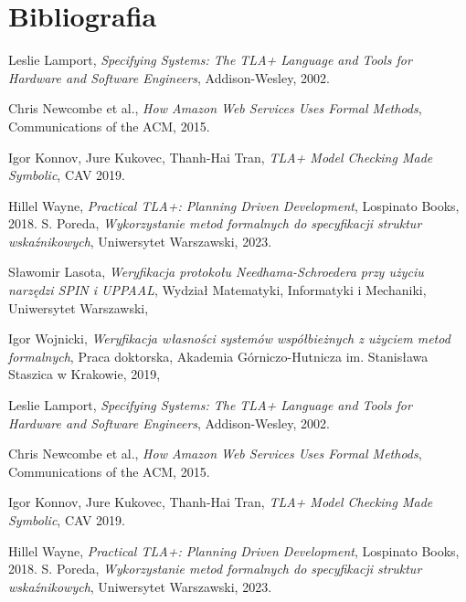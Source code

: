 \documentclass[conference]{IEEEtran}
\begin{document}
    
    \section{Bibliografia}
        \begin{thebibliography}{00}
            Leslie Lamport, \emph{Specifying Systems: The TLA+ Language and Tools for Hardware and Software Engineers}, Addison-Wesley, 2002.
          
            Chris Newcombe et al., \emph{How Amazon Web Services Uses Formal Methods}, Communications of the ACM, 2015.
          
            Igor Konnov, Jure Kukovec, Thanh-Hai Tran, \emph{TLA+ Model Checking Made Symbolic}, CAV 2019.
          
            Hillel Wayne, \emph{Practical TLA+: Planning Driven Development}, Lospinato Books, 2018.
            S. Poreda,
            \textit{Wykorzystanie metod formalnych do specyfikacji struktur wskaźnikowych},
            Uniwersytet Warszawski, 2023.
        
            Sławomir Lasota,
            \textit{Weryfikacja protokołu Needhama-Schroedera przy użyciu narzędzi SPIN i UPPAAL},
            Wydział Matematyki, Informatyki i Mechaniki, Uniwersytet Warszawski,
        
            Igor Wojnicki,
            \textit{Weryfikacja własności systemów współbieżnych z użyciem metod formalnych},
            Praca doktorska, Akademia Górniczo-Hutnicza im. Stanisława Staszica w Krakowie, 2019,

            Leslie Lamport, \emph{Specifying Systems: The TLA+ Language and Tools for Hardware and Software Engineers}, Addison-Wesley, 2002.
        
            Chris Newcombe et al., \emph{How Amazon Web Services Uses Formal Methods}, Communications of the ACM, 2015.
        
            Igor Konnov, Jure Kukovec, Thanh-Hai Tran, \emph{TLA+ Model Checking Made Symbolic}, CAV 2019.
        
            Hillel Wayne, \emph{Practical TLA+: Planning Driven Development}, Lospinato Books, 2018.
            S. Poreda,
            \textit{Wykorzystanie metod formalnych do specyfikacji struktur wskaźnikowych},
            Uniwersytet Warszawski, 2023.
        \end{thebibliography}
\end{document}
